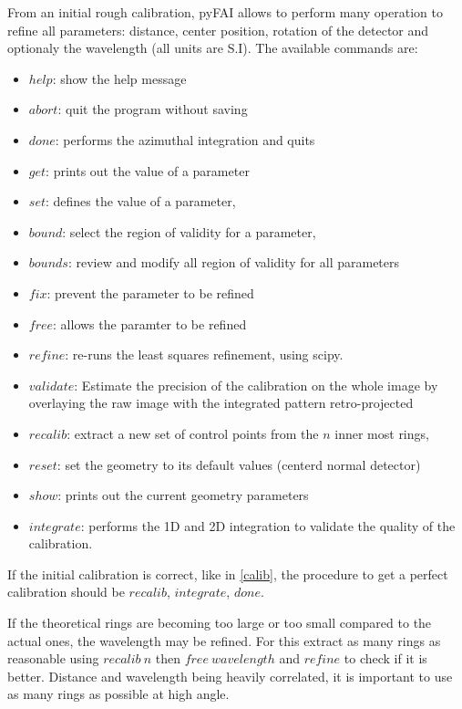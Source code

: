 \documentclass[preprint]{iucr}
\begin{document}
From an initial rough calibration, pyFAI allows to perform many operation to
refine all parameters: distance, center position, rotation of the detector and
optionaly the wavelength (all units are S.I). 
The available commands are:
\begin{itemize}
\item $help$: show the help message
\item $abort$: quit the program without saving
\item $done$: performs the azimuthal integration and quits
\item $get$: prints out the value of a parameter 
\item $set$: defines the value of a parameter,  
\item $bound$: select the region of validity for a parameter, 
\item $bounds$: review and modify all region of validity for all parameters
\item $fix$: prevent the parameter to be refined 
\item $free$: allows the paramter to be refined 
\item $refine$: re-runs the least squares refinement, using scipy.
\item $validate$: Estimate the precision of the calibration on the whole
image by overlaying the raw image with the integrated pattern retro-projected
\item $recalib$: extract a new set of control points from the $n$ inner most
rings,
\item $reset$: set the geometry to its default values (centerd normal detector)
\item $show$: prints out the current geometry parameters
\item $integrate$: performs the 1D and 2D integration to validate the quality of
the calibration.
\end{itemize}

If the initial calibration is correct, like in \ref{calib}, the procedure
to get a perfect calibration should be $recalib$, $integrate$, $done$.

If the theoretical rings are becoming too large or too small compared to the
actual ones, the wavelength may be refined. For this extract as many rings as
reasonable using $recalib\ n$ then $free\ wavelength$ and $refine$ to check if
it is better. Distance and wavelength being heavily correlated, it is important
to use as many rings as possible at high angle.
\end{document}

